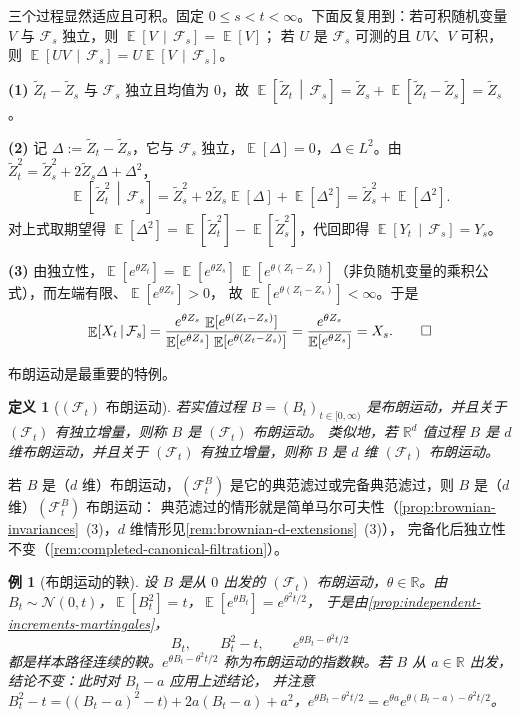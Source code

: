 \documentclass[UTF8,11pt,a4paper,oneside,fontset=fandol]{ctexrep}
\makeatletter
\numberwithin{equation}{section}
\theoremstyle{zhthm}
\newtheorem{definition}[theorem]{定义}
\newtheorem{example}[theorem]{例}
\renewenvironment{proof}[1][\proofname]{\par
  \pushQED{\qed}%
  \normalfont\topsep6\p@\@plus6\p@\relax
  \trivlist
  \item[\hskip\labelsep\bfseries#1\hspace{0.5em}]\ignorespaces
}{%
  \popQED\endtrivlist\@endpefalse
}
\renewcommand{\proofname}{证明}
\newcommand{\R}{\mathbb{R}}
\newcommand{\F}{\mathcal{F}}
\DeclareMathOperator{\E}{\mathbb{E}}
\newcommand{\Normal}{\mathcal{N}}
\newcommand{\Econd}[2]{%
  \E\!\left[#1\,\middle|\,#2\right]}
\makeatother
\begin{document}
\begin{proof}
三个过程显然适应且可积。固定 $0\le s<t<\infty$。下面反复用到：若可积随机变量 $V$ 与 $\F_s$ 独立，则 $\Econd{V}{\F_s}=\E[V]$\cite[例 4.1.4，第 208 页]{Durrett2019}；
若 $U$ 是 $\F_s$ 可测的且 $UV$、$V$ 可积，则 $\Econd{UV}{\F_s}=U\Econd{V}{\F_s}$\cite[定理 4.1.14，第 212 页]{Durrett2019}。

\textbf{(1)} $\widetilde Z_t-\widetilde Z_s$ 与 $\F_s$ 独立且均值为 $0$，故 $\Econd{\widetilde Z_t}{\F_s}=\widetilde Z_s+\E[\widetilde Z_t-\widetilde Z_s]=\widetilde Z_s$。

\textbf{(2)} 记 $\Delta:=\widetilde Z_t-\widetilde Z_s$，它与 $\F_s$ 独立，$\E[\Delta]=0$，$\Delta\in L^2$。由 $\widetilde Z_t^2=\widetilde Z_s^2+2\widetilde Z_s\Delta+\Delta^2$，
\[
  \Econd{\widetilde Z_t^2}{\F_s}=\widetilde Z_s^2+2\widetilde Z_s\E[\Delta]+\E[\Delta^2]=\widetilde Z_s^2+\E[\Delta^2].
\]
对上式取期望得 $\E[\Delta^2]=\E[\widetilde Z_t^2]-\E[\widetilde Z_s^2]$，代回即得 $\Econd{Y_t}{\F_s}=Y_s$。

\textbf{(3)} 由独立性，$\E[e^{\theta Z_t}]=\E[e^{\theta Z_s}]\,\E[e^{\theta(Z_t-Z_s)}]$（非负随机变量的乘积公式），而左端有限、$\E[e^{\theta Z_s}]>0$，
故 $\E[e^{\theta(Z_t-Z_s)}]<\infty$。于是
\[
  \Econd{X_t}{\F_s}=\frac{e^{\theta Z_s}\,\E[e^{\theta(Z_t-Z_s)}]}{\E[e^{\theta Z_s}]\,\E[e^{\theta(Z_t-Z_s)}]}=\frac{e^{\theta Z_s}}{\E[e^{\theta Z_s}]}=X_s.\qedhere
\]
\end{proof}

布朗运动是最重要的特例。

\begin{definition}[$(\F_t)$ 布朗运动]
\label{def:filtration-brownian-motion}
若实值过程 $B=(B_t)_{t\in[0,\infty)}$ 是布朗运动，并且关于 $(\F_t)$ 有独立增量，则称 $B$ 是 $(\F_t)$ 布朗运动。
类似地，若 $\R^d$ 值过程 $B$ 是 $d$ 维布朗运动，并且关于 $(\F_t)$ 有独立增量，则称 $B$ 是 $d$ 维 $(\F_t)$ 布朗运动。
\end{definition}

若 $B$ 是（$d$ 维）布朗运动，$(\F^B_t)$ 是它的典范滤过或完备典范滤过，则 $B$ 是（$d$ 维）$(\F^B_t)$ 布朗运动：
典范滤过的情形就是简单马尔可夫性（\cref{prop:brownian-invariances}~(3)，$d$ 维情形见\cref{rem:brownian-d-extensions}~(3)），
完备化后独立性不变（\cref{rem:completed-canonical-filtration}）。

\begin{example}[布朗运动的鞅]
\label{ex:brownian-martingales}
设 $B$ 是从 $0$ 出发的 $(\F_t)$ 布朗运动，$\theta\in\R$。由 $B_t\sim\Normal(0,t)$，$\E[B_t^2]=t$，$\E[e^{\theta B_t}]=e^{\theta^2t/2}$，
于是由\cref{prop:independent-increments-martingales}，
\[
  B_t,\qquad B_t^2-t,\qquad e^{\theta B_t-\theta^2t/2}
\]
都是样本路径连续的鞅。$e^{\theta B_t-\theta^2t/2}$ 称为布朗运动的指数鞅。若 $B$ 从 $a\in\R$ 出发，结论不变：此时对 $B_t-a$ 应用上述结论，
并注意 $B_t^2-t=\bigl((B_t-a)^2-t\bigr)+2a(B_t-a)+a^2$，$e^{\theta B_t-\theta^2t/2}=e^{\theta a}e^{\theta(B_t-a)-\theta^2t/2}$。
\end{example}
\end{document}
